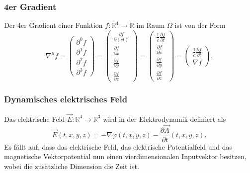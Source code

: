 \subsubsection{4er Gradient}
Der 4er Gradient einer Funktion $f: \mathbb{R}^4 \rightarrow \mathbb{R}$ im Raum $\Omega$ ist von der Form
\[
\renewcommand{\arraystretch}{1.9}
\nabla^\mu f
=
\begin{pmatrix}
	\displaystyle
	\partial^0 f\\
	\displaystyle
	\partial^1 f\\
	\displaystyle
	\partial^2 f\\
	\displaystyle
	\partial^3 f
\end{pmatrix}
=
\begin{pmatrix}
	\displaystyle
	\frac{\partial f}{\partial (ct)}\\
	\displaystyle
	\frac{\partial f}{\partial x}\\
	\displaystyle
	\frac{\partial f}{\partial y}\\
	\displaystyle
	\frac{\partial f}{\partial z}
\end{pmatrix}
=
\begin{pmatrix}
	\displaystyle
	\frac{1}{c}\frac{\partial f}{\partial t}\\
	\displaystyle
	\frac{\partial f}{\partial x}\\
	\displaystyle
	\frac{\partial f}{\partial y}\\
	\displaystyle
	\frac{\partial f}{\partial z}
\end{pmatrix}
=
\begin{pmatrix}
	\displaystyle
	\frac{1}{c}\frac{\partial f}{\partial t}\\
	\displaystyle
	\nabla f
\end{pmatrix}.
\]


\subsubsection{Dynamisches elektrisches Feld}
Das elektrische Feld
\(
\vec{E}: \mathbb{R}^4 \rightarrow \mathbb{R}^3
\)
wird in der Elektrodynamik definiert als
\begin{equation}
	\vec{E}(t,x,y,z)
	=
	- \nabla\varphi(t,x,y,z) - \frac{\partial \vec{A}}{\partial t}(t,x,y,z).
	\label{maxwell:section:definiton_dynamisch_elektrischesFeld}
\end{equation}
Es fällt auf, dass das elektrische Feld, das elektrische Potentialfeld und das magnetische Vektorpotential nun einen vierdimensionalen Inputvektor besitzen, wobei die zusätzliche Dimension die Zeit ist. 


